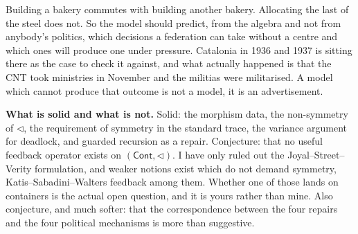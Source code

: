 \documentclass[11pt,a4paper]{article}
\begin{document}
Building a bakery commutes with building another bakery. Allocating the last of
the steel does not. So the model should predict, from the algebra and not from
anybody's politics, which decisions a federation can take without a centre and
which ones will produce one under pressure. Catalonia in 1936 and 1937 is sitting
there as the case to check it against, and what actually happened is that the CNT
took ministries in November and the militias were militarised. A model which
cannot produce that outcome is not a model, it is an advertisement.

\begin{alarmbox}
\textbf{What is solid and what is not.} Solid: the morphism data, the
non-symmetry of $\triangleleft$, the requirement of symmetry in the standard
trace, the variance argument for deadlock, and guarded recursion as a repair.
Conjecture: that no useful feedback operator exists on
$(\mathsf{Cont}, \triangleleft)$. I have only ruled out the
Joyal--Street--Verity formulation, and weaker notions exist which do not demand
symmetry, Katis--Sabadini--Walters feedback among them. Whether one of those
lands on containers is the actual open question, and it is yours rather than
mine. Also conjecture, and much softer: that the correspondence between the four
repairs and the four political mechanisms is more than suggestive.
\end{alarmbox}
\end{document}
